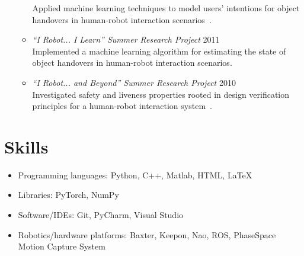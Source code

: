 \documentclass[10pt,letterpaper]{article}
\newcommand{\thing}[2]{{#1} \hfill {#2}}
\begin{document}
\begin{itemize}
\begin{itemize}
	Applied machine learning techniques to model users' intentions for object handovers in human-robot interaction scenarios~\cite{grigore2013joint}.
	\item \thing{\it ``I Robot... I Learn'' Summer Research Project}{2011}\vspace{-0.1em}\\
	Implemented a machine learning algorithm for estimating the state of object handovers in human-robot interaction scenarios.
	\item \thing{\it ``I Robot... and Beyond'' Summer Research Project}{2010}\vspace{-0.1em}\\
	 Investigated safety and liveness properties rooted in design verification principles for a human-robot interaction system~\cite{grigore2011towards}. 
	\end{itemize}
\end{itemize}

\section{Skills}
\begin{itemize}%
\item Programming languages: Python, C++, Matlab, HTML, LaTeX
\item Libraries: PyTorch, NumPy
\item Software/IDEs: Git, PyCharm, Visual Studio
\item Robotics/hardware platforms: Baxter, Keepon, Nao, ROS, PhaseSpace Motion Capture System
\end{itemize}
\end{document}
